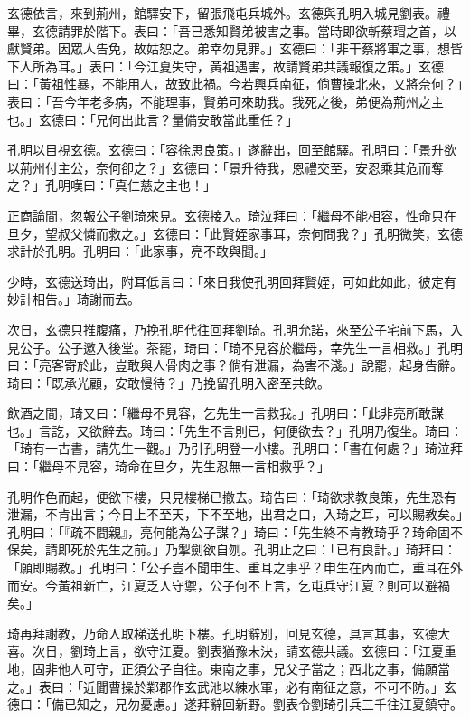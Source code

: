 玄德依言，來到荊州，館驛安下，留張飛屯兵城外。玄德與孔明入城見劉表。禮畢，玄德請罪於階下。表曰：「吾已悉知賢弟被害之事。當時即欲斬蔡瑁之首，以獻賢弟。因眾人告免，故姑恕之。弟幸勿見罪。」玄德曰：「非干蔡將軍之事，想皆下人所為耳。」表曰：「今江夏失守，黃祖遇害，故請賢弟共議報復之策。」玄德曰：「黃祖性暴，不能用人，故致此禍。今若興兵南征，倘曹操北來，又將奈何？」表曰：「吾今年老多病，不能理事，賢弟可來助我。我死之後，弟便為荊州之主也。」玄德曰：「兄何出此言？量備安敢當此重任？」

孔明以目視玄德。玄德曰：「容徐思良策。」遂辭出，回至館驛。孔明曰：「景升欲以荊州付主公，奈何卻之？」玄德曰：「景升待我，恩禮交至，安忍乘其危而奪之？」孔明嘆曰：「真仁慈之主也！」

正商論間，忽報公子劉琦來見。玄德接入。琦泣拜曰：「繼母不能相容，性命只在旦夕，望叔父憐而救之。」玄德曰：「此賢姪家事耳，奈何問我？」孔明微笑，玄德求計於孔明。孔明曰：「此家事，亮不敢與聞。」

少時，玄德送琦出，附耳低言曰：「來日我使孔明回拜賢姪，可如此如此，彼定有妙計相告。」琦謝而去。

次日，玄德只推腹痛，乃挽孔明代往回拜劉琦。孔明允諾，來至公子宅前下馬，入見公子。公子邀入後堂。茶罷，琦曰：「琦不見容於繼母，幸先生一言相救。」孔明曰：「亮客寄於此，豈敢與人骨肉之事？倘有泄漏，為害不淺。」說罷，起身告辭。琦曰：「既承光顧，安敢慢待？」乃挽留孔明入密至共飲。

飲酒之間，琦又曰：「繼母不見容，乞先生一言救我。」孔明曰：「此非亮所敢謀也。」言訖，又欲辭去。琦曰：「先生不言則已，何便欲去？」孔明乃復坐。琦曰：「琦有一古書，請先生一觀。」乃引孔明登一小樓。孔明曰：「書在何處？」琦泣拜曰：「繼母不見容，琦命在旦夕，先生忍無一言相救乎？」

孔明作色而起，便欲下樓，只見樓梯已撤去。琦告曰：「琦欲求教良策，先生恐有泄漏，不肯出言；今日上不至天，下不至地，出君之口，入琦之耳，可以賜教矣。」孔明曰：「『疏不間親』，亮何能為公子謀？」琦曰：「先生終不肯教琦乎？琦命固不保矣，請即死於先生之前。」乃掣劍欲自刎。孔明止之曰：「已有良計。」琦拜曰：「願即賜教。」孔明曰：「公子豈不聞申生、重耳之事乎？申生在內而亡，重耳在外而安。今黃祖新亡，江夏乏人守禦，公子何不上言，乞屯兵守江夏？則可以避禍矣。」

琦再拜謝教，乃命人取梯送孔明下樓。孔明辭別，回見玄德，具言其事，玄德大喜。次日，劉琦上言，欲守江夏。劉表猶豫未決，請玄德共議。玄德曰：「江夏重地，固非他人可守，正須公子自往。東南之事，兄父子當之；西北之事，備願當之。」表曰：「近聞曹操於鄴郡作玄武池以練水軍，必有南征之意，不可不防。」玄德曰：「備已知之，兄勿憂慮。」遂拜辭回新野。劉表令劉琦引兵三千往江夏鎮守。

